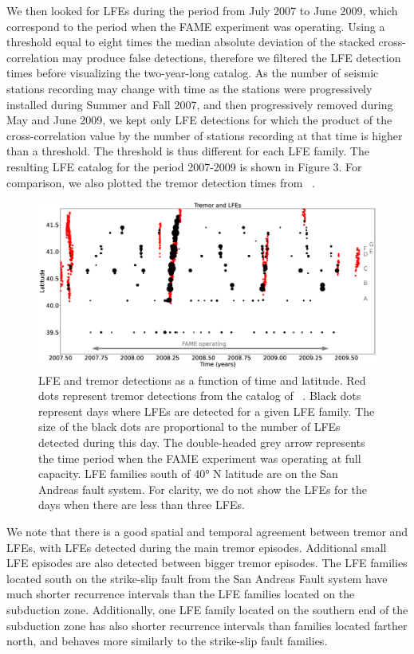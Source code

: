 \documentclass[draft]{agujournal2019}
\begin{document}
We then looked for LFEs during the period from July 2007 to June 2009, which correspond to the period when the FAME experiment was operating. Using a threshold equal to eight times the median absolute deviation of the stacked cross-correlation may produce false detections, therefore we filtered the LFE detection times before visualizing the two-year-long catalog. As the number of seismic stations recording may change with time as the stations were progressively installed during Summer and Fall 2007, and then progressively removed during May and June 2009, we kept only LFE detections for which the product of the cross-correlation value by the number of stations recording at that time is higher than a threshold. The threshold is thus different for each LFE family. The resulting LFE catalog for the period 2007-2009 is shown in Figure 3. For comparison, we also plotted the tremor detection times from ~. \\

\begin{figure}
\noindent\includegraphics[width=\textwidth, trim={0cm 0cm 0cm 0cm},clip]{figures/tremor_nb_FAME_3.eps}
\caption{LFE and tremor detections as a function of time and latitude. Red dots represent tremor detections from the catalog of ~. Black dots represent days where LFEs are detected for a given LFE family. The size of the black dots are proportional to the number of LFEs detected during this day. The double-headed grey arrow represents the time period when the FAME experiment was operating at full capacity. LFE families south of 40° N latitude are on the San Andreas fault system. For clarity, we do not show the LFEs for the days when there are less than three LFEs.}
\label{pngfiguresample}
\end{figure}

We note that there is a good spatial and temporal agreement between tremor and LFEs, with LFEs detected during the main tremor episodes. Additional small LFE episodes are also detected between bigger tremor episodes. The LFE families located south on the strike-slip fault from the San Andreas Fault system have much shorter recurrence intervals than the LFE families located on the subduction zone. Additionally, one LFE family located on the southern end of the subduction zone has also shorter recurrence intervals than families located farther north, and behaves more similarly to the strike-slip fault families. \\
\end{document}
